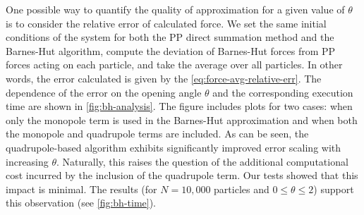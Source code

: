 One possible way to quantify the quality of approximation for a given value of $\theta$ is to consider the relative error of calculated force.
We set the same initial conditions of the system for both the PP direct summation method and the Barnes-Hut algorithm, compute the deviation of Barnes-Hut forces from PP forces acting on each particle, and take the average over all particles.
In other words, the error calculated is given by the \autoref{eq:force-avg-relative-err}.
The dependence of the error on the opening angle $\theta$ and the corresponding execution time are shown in \autoref{fig:bh-analysis}.
The figure includes plots for two cases: when only the monopole term is used in the Barnes-Hut approximation and when both the monopole and quadrupole terms are included.
As can be seen, the quadrupole-based algorithm exhibits significantly improved error scaling with increasing $\theta$.
Naturally, this raises the question of the additional computational cost incurred by the inclusion of the quadrupole term.
Our tests showed that this impact is minimal.
The results (for $N = 10{,}000$ particles and $0 \leq \theta \leq 2$) support this observation (see \autoref{fig:bh-time}).
